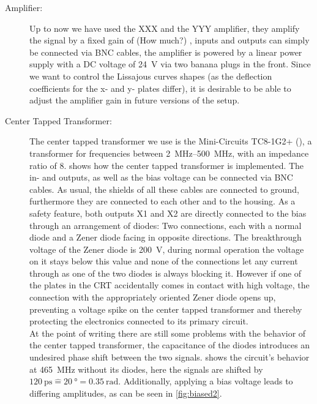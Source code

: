 \begin{description}
	\item[Amplifier:] Up to now we have used the XXX  and the YYY  amplifier, they amplify the signal by a fixed gain of (How much?) , inputs and outputs can simply be connected via BNC cables, the amplifier is powered by a linear power supply with a DC voltage of \SI{24}{\volt} via two banana plugs in the front. Since we want to control the Lissajous curves shapes (as the deflection coefficients for the x- and y- plates differ), it is desirable to be able to adjust the amplifier gain in future versions of the setup. 
	
	\item[Center Tapped Transformer:] The center tapped transformer we use is the Mini-Circuits TC8-1G2+ (\cite{TC8-1G2}), a transformer for frequencies between \SIrange{2}{500}{\mega\hertz}, with an impedance ratio of 8.  shows how the center tapped transformer is implemented. The in- and outputs, as well as the bias voltage can be connected via BNC cables. As usual, the shields of all these cables are connected to ground, furthermore they are connected to each other and to the housing. As a safety feature, both outputs X1 and X2 are directly connected to the bias through an arrangement of diodes: Two connections, each with a normal diode and a Zener diode facing in opposite directions. The breakthrough voltage of the Zener diode is \SI{200}{\volt}, during normal operation the voltage on it stays below this value and none of the connections let any current through as one of the two diodes is always blocking it. However if one of the plates in the CRT accidentally comes in contact with high voltage, the connection with the appropriately oriented Zener diode opens up, preventing a voltage spike on the center tapped transformer and thereby protecting the electronics connected to its primary circuit.\\
	At the point of writing there are still some problems with the behavior of the center tapped transformer, the capacitance of the diodes introduces an undesired phase shift between the two signals.  shows the circuit's behavior at \SI{465}{\mega\hertz} without its diodes, here the signals are shifted by $\SI{120}{\pico\second} \mathrel{\widehat{=}} \SI{20}{\degree} = \SI{0.35}{\radian}$. Additionally, applying a bias voltage leads to differing amplitudes, as can be seen in \cref{fig:biased2}.  

\end{description}
